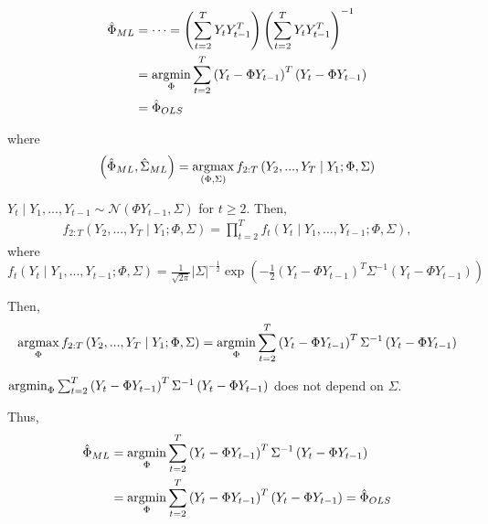 \documentclass[11pt]{elegantbook}
\newcommand{\argmax}{\operatornamewithlimits{argmax}}
\newcommand{\argmin}{\operatornamewithlimits{argmin}}
\begin{document}
\begin{claim}
    \begin{equation}
        \begin{aligned}
            \hat{\Phi}_{ML}&=\cdots=\left(\sum_{t=2}^T Y_tY_{t-1}^T\right)\left(\sum_{t=2}^T Y_tY_{t-1}^T\right)^{-1}\\
            &=\argmin_{\Phi} \sum_{t=2}^T \left(Y_t-\Phi Y_{t-1}\right)^T\left(Y_t-\Phi Y_{t-1}\right)\\
            &=\hat{\Phi}_{OLS}
        \end{aligned}
        \nonumber
    \end{equation}
\end{claim}
where
\begin{equation}
    \begin{aligned}
        \left(\hat{\Phi}_{ML},\hat{\Sigma}_{ML}\right)=\argmax_{(\Phi,\Sigma)} f_{2:T}\left(Y_2,...,Y_T\mid Y_1;\Phi,\Sigma\right)
    \end{aligned}
    \nonumber
\end{equation}

\begin{lemma}
    $Y_t\mid Y_1,...,Y_{t-1}\sim \mathcal{N}(\Phi Y_{t-1},\Sigma)$ for $t\geq 2$. Then,
    \begin{equation}
        \begin{aligned}
            f_{2:T}\left(Y_2,...,Y_T\mid Y_1;\Phi,\Sigma\right)=\prod_{t=2}^Tf_t\left(Y_t\mid Y_1,...,Y_{t-1};\Phi,\Sigma\right),
        \end{aligned}
        \nonumber
    \end{equation}
    where $f_t\left(Y_t\mid Y_1,...,Y_{t-1};\Phi,\Sigma\right)=\frac{1}{\sqrt{2\pi}}|\Sigma|^{-\frac{1}{2}}\exp\left(-\frac{1}{2}\left(Y_t-\Phi Y_{t-1}\right)^T\Sigma^{-1}\left(Y_t-\Phi Y_{t-1}\right)\right)$
\end{lemma}
Then,
\begin{equation}
    \begin{aligned}
        \argmax_{\Phi} f_{2:T}\left(Y_2,...,Y_T\mid Y_1;\Phi,\Sigma\right)=\argmin_{\Phi} \sum_{t=2}^T \left(Y_t-\Phi Y_{t-1}\right)^T\Sigma^{-1}\left(Y_t-\Phi Y_{t-1}\right)
    \end{aligned}
    \nonumber
\end{equation}

\begin{lemma}
    $\argmin_{\Phi} \sum_{t=2}^T \left(Y_t-\Phi Y_{t-1}\right)^T\Sigma^{-1}\left(Y_t-\Phi Y_{t-1}\right)$ does not depend on $\Sigma$.
\end{lemma}
Thus,
\begin{equation}
    \begin{aligned}
        \hat{\Phi}_{ML}&=\argmin_{\Phi} \sum_{t=2}^T \left(Y_t-\Phi Y_{t-1}\right)^T\Sigma^{-1}\left(Y_t-\Phi Y_{t-1}\right)\\
        &=\argmin_{\Phi} \sum_{t=2}^T \left(Y_t-\Phi Y_{t-1}\right)^T\left(Y_t-\Phi Y_{t-1}\right)=\hat{\Phi}_{OLS}
    \end{aligned}
    \nonumber
\end{equation}
\end{document}
